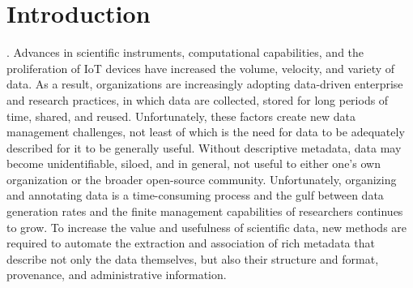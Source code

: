 \documentclass[sigconf]{acmart}
\newcommand{\tyler}[1]{}
\newcommand{\kyle}[1]{}
\newcommand{\tyler}[1]{{\textcolor{cyan}{ tyler: #1 }}}
\newcommand{\kyle}[1]{{\textcolor{purple}{ Kyle: #1 }}}
\begin{document}


\maketitle


\section{Introduction}


\kyle{this is similar to workshop paper. what are the rules on re-using text?}. \tyler{I'll probably rewrite to be safe}
Advances in scientific instruments, computational capabilities, and the proliferation of IoT devices
have increased the volume, velocity, and variety of data. 
As a result, organizations are increasingly adopting data-driven enterprise and research practices, 
in which data are collected, stored for long periods of time, shared, 
and reused.
Unfortunately, these factors create new data management challenges, 
not least of which is the need for data to be adequately described
for it to be generally useful. Without descriptive metadata, data
may become unidentifiable, siloed, and in general, 
not useful to either one's own organization or the broader open-source community. 
Unfortunately, organizing and annotating data is a time-consuming process
and the gulf between data generation rates
and the finite management capabilities of researchers
continues to grow. To increase the value and usefulness of scientific data, 
new methods are required to automate the extraction and association 
of rich metadata that describe not only the data themselves, but
also their structure and format, provenance, and administrative information.
\end{document}
